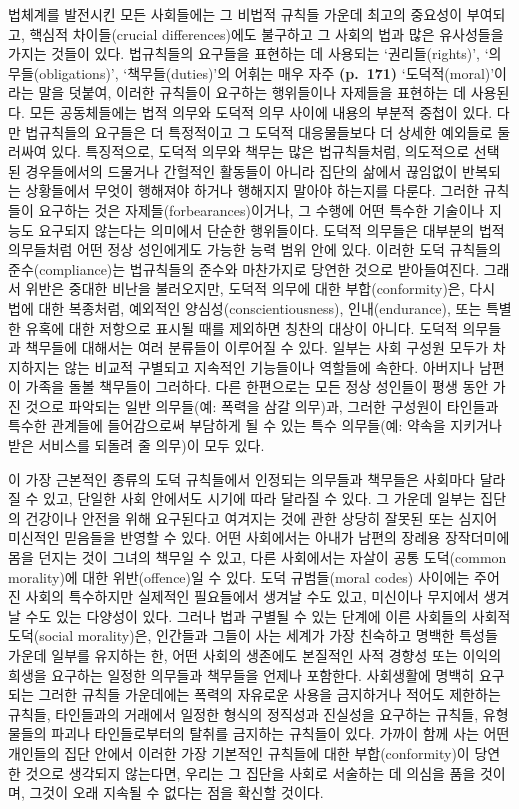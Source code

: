법체계를 발전시킨 모든 사회들에는 그 비법적 규칙들 가운데 최고의
중요성이 부여되고, 핵심적 차이들(crucial differences)에도 불구하고 그
사회의 법과 많은 유사성들을 가지는 것들이 있다. 법규칙들의 요구들을
표현하는 데 사용되는 ‘권리들(rights)’, ‘의무들(obligations)’,
‘책무들(duties)’의 어휘는 매우 자주 \textbf{(p.~171)}
‘도덕적(moral)’이라는 말을 덧붙여, 이러한 규칙들이 요구하는 행위들이나
자제들을 표현하는 데 사용된다. 모든 공동체들에는 법적 의무와 도덕적 의무
사이에 내용의 부분적 중첩이 있다. 다만 법규칙들의 요구들은 더 특정적이고
그 도덕적 대응물들보다 더 상세한 예외들로 둘러싸여 있다. 특징적으로,
도덕적 의무와 책무는 많은 법규칙들처럼, 의도적으로 선택된 경우들에서의
드물거나 간헐적인 활동들이 아니라 집단의 삶에서 끊임없이 반복되는
상황들에서 무엇이 행해져야 하거나 행해지지 말아야 하는지를 다룬다.
그러한 규칙들이 요구하는 것은 자제들(forbearances)이거나, 그 수행에 어떤
특수한 기술이나 지능도 요구되지 않는다는 의미에서 단순한 행위들이다.
도덕적 의무들은 대부분의 법적 의무들처럼 어떤 정상 성인에게도 가능한
능력 범위 안에 있다. 이러한 도덕 규칙들의 준수(compliance)는 법규칙들의
준수와 마찬가지로 당연한 것으로 받아들여진다. 그래서 위반은 중대한
비난을 불러오지만, 도덕적 의무에 대한 부합(conformity)은, 다시 법에 대한
복종처럼, 예외적인 양심성(conscientiousness), 인내(endurance), 또는
특별한 유혹에 대한 저항으로 표시될 때를 제외하면 칭찬의 대상이 아니다.
도덕적 의무들과 책무들에 대해서는 여러 분류들이 이루어질 수 있다. 일부는
사회 구성원 모두가 차지하지는 않는 비교적 구별되고 지속적인 기능들이나
역할들에 속한다. 아버지나 남편이 가족을 돌볼 책무들이 그러하다. 다른
한편으로는 모든 정상 성인들이 평생 동안 가진 것으로 파악되는 일반
의무들(예: 폭력을 삼갈 의무)과, 그러한 구성원이 타인들과 특수한 관계들에
들어감으로써 부담하게 될 수 있는 특수 의무들(예: 약속을 지키거나 받은
서비스를 되돌려 줄 의무)이 모두 있다.

이 가장 근본적인 종류의 도덕 규칙들에서 인정되는 의무들과 책무들은
사회마다 달라질 수 있고, 단일한 사회 안에서도 시기에 따라 달라질 수
있다. 그 가운데 일부는 집단의 건강이나 안전을 위해 요구된다고 여겨지는
것에 관한 상당히 잘못된 또는 심지어 미신적인 믿음들을 반영할 수 있다.
어떤 사회에서는 아내가 남편의 장례용 장작더미에 몸을 던지는 것이 그녀의
책무일 수 있고, 다른 사회에서는 자살이 공통 도덕(common morality)에 대한
위반(offence)일 수 있다. 도덕 규범들(moral codes) 사이에는 주어진 사회의
특수하지만 실제적인 필요들에서 생겨날 수도 있고, 미신이나 무지에서
생겨날 수도 있는 다양성이 있다. 그러나 법과 구별될 수 있는 단계에 이른
사회들의 사회적 도덕(social morality)은, 인간들과 그들이 사는 세계가
가장 친숙하고 명백한 특성들 가운데 일부를 유지하는 한, 어떤 사회의
생존에도 본질적인 사적 경향성 또는 이익의 희생을 요구하는 일정한
의무들과 책무들을 언제나 포함한다. 사회생활에 명백히 요구되는 그러한
규칙들 가운데에는 폭력의 자유로운 사용을 금지하거나 적어도 제한하는
규칙들, 타인들과의 거래에서 일정한 형식의 정직성과 진실성을 요구하는
규칙들, 유형물들의 파괴나 타인들로부터의 탈취를 금지하는 규칙들이 있다.
가까이 함께 사는 어떤 개인들의 집단 안에서 이러한 가장 기본적인 규칙들에
대한 부합(conformity)이 당연한 것으로 생각되지 않는다면, 우리는 그
집단을 사회로 서술하는 데 의심을 품을 것이며, 그것이 오래 지속될 수
없다는 점을 확신할 것이다.

